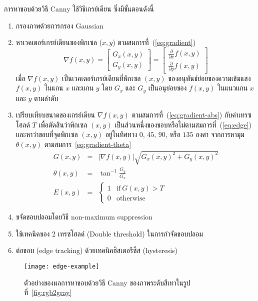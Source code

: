 การหาขอบด้วยวิธี Canny ใช้วิธีเกรย์เดียน ซึ่งมีขั้นตอนดังนี้
\begin{enumerate}
\item กรองภาพด้วยการกรอง Gaussian
\item หาเวคเตอร์เกรย์เดียนของพิกเซล ($x,y$) ตามสมการที่~(\ref{eq:gradient})
\begin{equation}
\nabla f(x,y) = \left[
\begin{array}{l}
G_x(x,y)\\
G_y(x,y)
\end{array}
\right] = \left[
\begin{array}{l}
\frac{\partial }{\partial x}f(x,y)\\
\frac{\partial }{\partial y}f(x,y)
\end{array}
\right]\label{eq:gradient}
\end{equation}
เมื่อ $\nabla f(x,y)$ เป็นเวคเตอร์เกรย์เดียนที่พิกเซล $(x,y)$ ของอนุพันธ์ย่อยของความเข้มแสง $f(x,y)$  ในแกน $x$ และแกน $y$ โดย $G_x$ และ $G_y$ เป็นอนุย่อยของ $f(x,y)$ ในแนวแกน $x$ และ $y$ ตามลำดับ
\item เปรียบเทียบขนาดของเกรย์เดียน $\nabla f(x,y)$  ตามสมการที่~(\ref{eq:gradient-abs}) กับค่าเทรซโฮลด์ $T$  เพื่อตัดสินว่าพิกเซล $(x,y)$ เป็นส่วนหนึ่งของขอบหรือไม่ตามสมการที่~(\ref{eq:edge}) และหาว่าขอบที่จุดพิกเซล $(x,y)$ อยู่ในทิศทาง $0$, $45$, $90$, หรือ $135$ องศา จากการหามุม $\theta (x,y)$ ตามสมการ~\ref{eq:gradient-theta}
\begin{eqnarray}
G(x,y) &=& |\nabla f(x,y)| \sqrt{G_x(x,y)^2 + G_y(x,y)^2}\label{eq:gradient-abs}\\
\theta (x,y) &=& \tan^{-1}\frac{G_y}{G_x}\label{eq:gradient-theta}\\
E(x,y) &=&\left\{ \begin{array}{ll}
1 & \mbox{if}\ G(x,y)  > T\\
0 & \mbox{otherwise}
\end{array}
\right.\label{eq:edge}
\end{eqnarray}
\item ขจัดขอบปลอมโดยวิธี non-maximum suppression
\item ใช้เทคนิคของ 2 เทรซโฮลด์ (Double threshold) ในการกำจัดขอบปลอม
\item ต่อขอบ (edge tracking) ด้วยเทคนิคฮิสเตอรีซีส (hysteresis)
\end{enumerate}

\begin{figure}[!ht]
\centering
\texttt{[image: edge-example]}
\caption{ตัวอย่างของผลการหาขอบด้วยวิธี Canny ของภาพระดับสีเทาในรูปที่~\ref{fig:rgb2gray}}
\label{fig:edege-example}
\end{figure}

